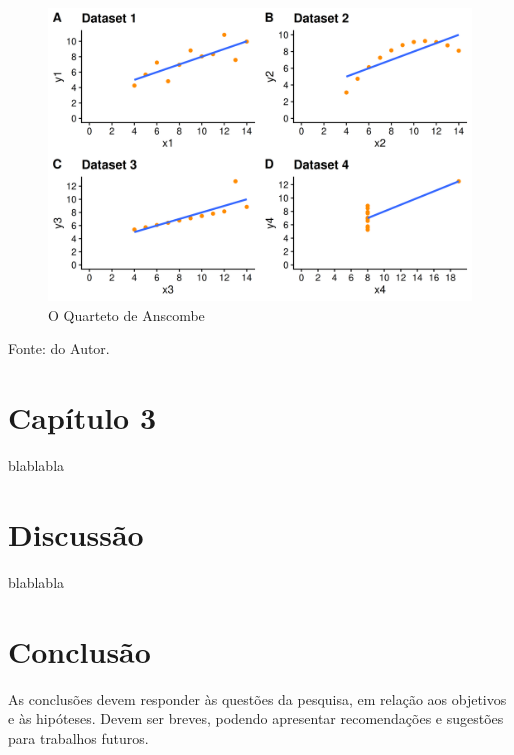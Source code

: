 \documentclass[
	12pt,				%
	oneside,			%
	a4paper,			%
	chapter=TITLE,		%
	section=TITLE,		%
	english,			%
	brazil				%
	]{abntex2}
\newcommand{\bcenter}{\begin{center}}
\newcommand{\ecenter}{\end{center}}
\begin{document}
\begin{figure}[H]

{\centering \includegraphics[width=1\linewidth]{images/anscombe2-1} 

}

\caption{O Quarteto de Anscombe}\label{fig:anscombe2}
\end{figure}
\bcenter

Fonte: do Autor.
\ecenter

\chapter*{Capítulo 3}\label{cap3}

blablabla

\chapter{Discussão}\label{disc}

blablabla

\chapter{Conclusão}\label{conclusuxe3o}

As conclusões devem responder às questões da pesquisa, em relação aos objetivos
e às hipóteses. Devem ser breves, podendo apresentar recomendações e sugestões
para trabalhos futuros.

\postextual

\begingroup

\printbibliography[title=REFERÊNCIAS]
\end{document}
